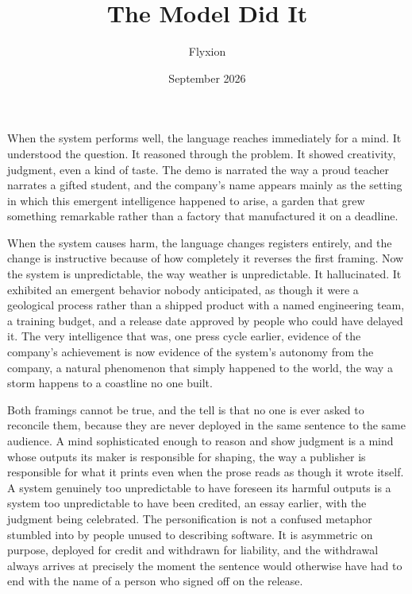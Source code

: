 \documentclass[11pt]{article}
\title{The Model Did It}
\author{Flyxion}
\date{September 2026}
\begin{document}
\maketitle

When the system performs well, the language reaches immediately for a mind. It understood the question. It reasoned through the problem. It showed creativity, judgment, even a kind of taste. The demo is narrated the way a proud teacher narrates a gifted student, and the company's name appears mainly as the setting in which this emergent intelligence happened to arise, a garden that grew something remarkable rather than a factory that manufactured it on a deadline.

When the system causes harm, the language changes registers entirely, and the change is instructive because of how completely it reverses the first framing. Now the system is unpredictable, the way weather is unpredictable. It hallucinated. It exhibited an emergent behavior nobody anticipated, as though it were a geological process rather than a shipped product with a named engineering team, a training budget, and a release date approved by people who could have delayed it. The very intelligence that was, one press cycle earlier, evidence of the company's achievement is now evidence of the system's autonomy from the company, a natural phenomenon that simply happened to the world, the way a storm happens to a coastline no one built.

Both framings cannot be true, and the tell is that no one is ever asked to reconcile them, because they are never deployed in the same sentence to the same audience. A mind sophisticated enough to reason and show judgment is a mind whose outputs its maker is responsible for shaping, the way a publisher is responsible for what it prints even when the prose reads as though it wrote itself. A system genuinely too unpredictable to have foreseen its harmful outputs is a system too unpredictable to have been credited, an essay earlier, with the judgment being celebrated. The personification is not a confused metaphor stumbled into by people unused to describing software. It is asymmetric on purpose, deployed for credit and withdrawn for liability, and the withdrawal always arrives at precisely the moment the sentence would otherwise have had to end with the name of a person who signed off on the release.
\end{document}
